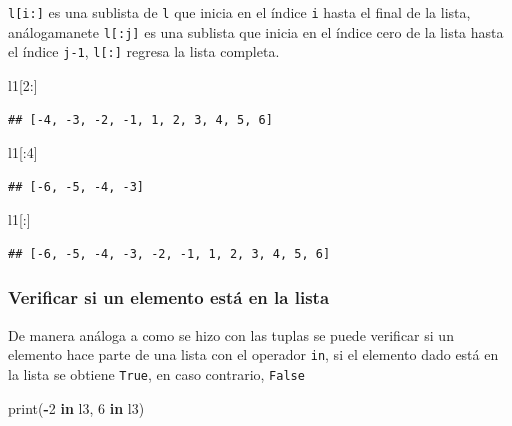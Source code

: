 \documentclass[
]{book}
\newenvironment{Shaded}{\begin{snugshade}}{\end{snugshade}}
\newcommand{\BuiltInTok}[1]{#1}
\newcommand{\DecValTok}[1]{\textcolor[rgb]{0.00,0.00,0.81}{#1}}
\newcommand{\KeywordTok}[1]{\textcolor[rgb]{0.13,0.29,0.53}{\textbf{#1}}}
\newcommand{\NormalTok}[1]{#1}
\newcommand{\OperatorTok}[1]{\textcolor[rgb]{0.81,0.36,0.00}{\textbf{#1}}}
\theoremstyle{definition}
\theoremstyle{definition}
\theoremstyle{definition}
\theoremstyle{definition}
\theoremstyle{remark}
\begin{document}
\texttt{l{[}i:{]}} es una sublista de \texttt{l} que inicia en el índice \texttt{i} hasta el final de la lista, análogamanete \texttt{l{[}:j{]}} es una sublista que inicia en el índice cero de la lista hasta el índice \texttt{j-1}, \texttt{l{[}:{]}} regresa la lista completa.

\begin{Shaded}
\begin{Highlighting}[]
\NormalTok{l1[}\DecValTok{2}\NormalTok{:]}
\end{Highlighting}
\end{Shaded}

\begin{verbatim}
## [-4, -3, -2, -1, 1, 2, 3, 4, 5, 6]
\end{verbatim}

\begin{Shaded}
\begin{Highlighting}[]
\NormalTok{l1[:}\DecValTok{4}\NormalTok{]}
\end{Highlighting}
\end{Shaded}

\begin{verbatim}
## [-6, -5, -4, -3]
\end{verbatim}

\begin{Shaded}
\begin{Highlighting}[]
\NormalTok{l1[:]}
\end{Highlighting}
\end{Shaded}

\begin{verbatim}
## [-6, -5, -4, -3, -2, -1, 1, 2, 3, 4, 5, 6]
\end{verbatim}

\hypertarget{verificar-si-un-elemento-estuxe1-en-la-lista}{%
\subsubsection{Verificar si un elemento está en la lista}\label{verificar-si-un-elemento-estuxe1-en-la-lista}}

De manera análoga a como se hizo con las tuplas se puede verificar si un elemento hace parte de una lista con el operador \texttt{in}, si el elemento dado está en la lista se obtiene \texttt{True}, en caso contrario, \texttt{False}

\begin{Shaded}
\begin{Highlighting}[]
\BuiltInTok{print}\NormalTok{(}\OperatorTok{{-}}\DecValTok{2} \KeywordTok{in}\NormalTok{ l3, }\DecValTok{6} \KeywordTok{in}\NormalTok{ l3)}
\end{Highlighting}
\end{Shaded}
\end{document}
